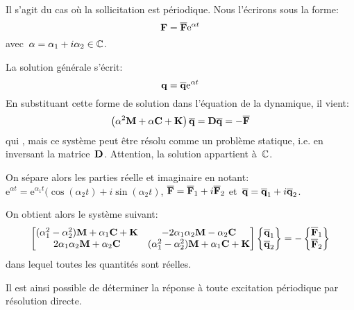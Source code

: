 Il s'agit du cas où la sollicitation est périodique. Nous l'écrirons sous la forme:
\begin{equation} \VV{F}=\VV{\overline{F}}\mathrm{e}^{\alpha t} \end{equation}
avec~$\alpha=\alpha_1+i\alpha_2\in\mathbb C$.

La solution générale s'écrit:
\begin{equation} \VV{q}=\VV{\overline{q}}\mathrm{e}^{\alpha t} \end{equation}
En substituant cette forme de solution dans l'équation de la dynamique, il vient:
\begin{equation} \left(\alpha^2\MM{M}+\alpha\MM{C}+\MM{K}\right)\VV{\overline{q}}=\MM{D}\VV{\overline{q}}=-\VV{\overline{F}} \end{equation}
qui , mais ce système peut être résolu
comme un problème statique, i.e. en inversant la matrice~$\MM{D}$. Attention, la solution appartient à~$\mathbb C$.

\medskip
On sépare alors les parties réelle et imaginaire en notant:
$\mathrm{e}^{\alpha t}=\mathrm{e}^{\alpha_1 t}(\cos(\alpha_2 t)+i\sin(\alpha_2 t)$, $\VV{\overline{F}}=\VV{\overline{F}}_1
+i\VV{\overline{F}}_2$ et~$\VV{\overline{q}}=\VV{\overline{q}}_1+i\VV{\overline{q}}_2$.

On obtient alors le système suivant:
\begin{equation}
\MM*{(\alpha_1^2-\alpha_2^2)\MM{M}+\alpha_1\MM{C}+\MM{K} & -2\alpha_1\alpha_2\MM{M}-\alpha_2\MM{C}\\
2\alpha_1\alpha_2\MM{M}+\alpha_2\MM{C} & (\alpha_1^2-\alpha_2^2)\MM{M}+\alpha_1\MM{C}+\MM{K}}
\VV*{\VV{\overline{q}}_1\\ \VV{\overline{q}}_2}
=
-\VV*{\VV{\overline{F}}_1\\ \VV{\overline{F}}_2}
\end{equation}
dans lequel toutes les quantités sont réelles.

Il est ainsi possible de déterminer la réponse à toute excitation périodique par résolution directe.

\medskip
{}

